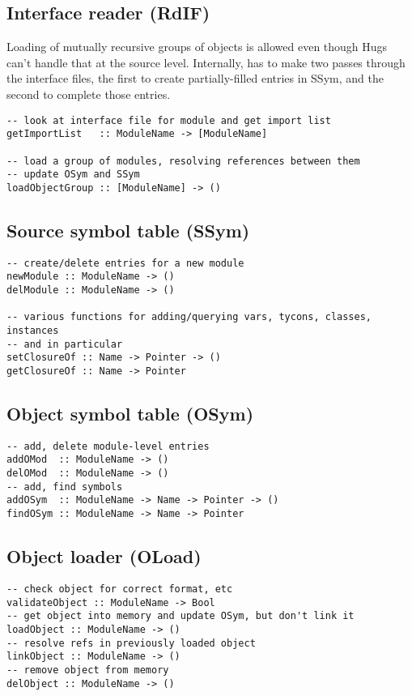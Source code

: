 \subsection{Interface reader (RdIF)}
Loading of mutually recursive groups of objects is allowed even
though Hugs can't handle that at the source level.  Internally,
 has to make two passes through the 
interface files, the first to create partially-filled entries in SSym, and the 
second to complete those entries.
\begin{verbatim}
-- look at interface file for module and get import list
getImportList   :: ModuleName -> [ModuleName]

-- load a group of modules, resolving references between them
-- update OSym and SSym
loadObjectGroup :: [ModuleName] -> ()
\end{verbatim}



\subsection{Source symbol table (SSym)}
\begin{verbatim}
-- create/delete entries for a new module
newModule :: ModuleName -> ()
delModule :: ModuleName -> ()

-- various functions for adding/querying vars, tycons, classes, instances
-- and in particular
setClosureOf :: Name -> Pointer -> ()
getClosureOf :: Name -> Pointer
\end{verbatim}


\subsection{Object symbol table (OSym)}
\begin{verbatim}
-- add, delete module-level entries
addOMod  :: ModuleName -> ()
delOMod  :: ModuleName -> ()
-- add, find symbols
addOSym  :: ModuleName -> Name -> Pointer -> ()
findOSym :: ModuleName -> Name -> Pointer
\end{verbatim}



\subsection{Object loader (OLoad)}
\begin{verbatim}
-- check object for correct format, etc
validateObject :: ModuleName -> Bool
-- get object into memory and update OSym, but don't link it
loadObject :: ModuleName -> ()
-- resolve refs in previously loaded object
linkObject :: ModuleName -> ()
-- remove object from memory
delObject :: ModuleName -> ()
\end{verbatim}


